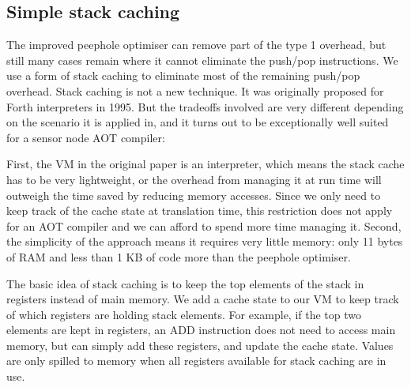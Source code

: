 
\subsection{Simple stack caching}
\label{sec-optimisations-simple-stack-caching}


The improved peephole optimiser can remove part of the type 1 overhead, but still many cases remain where it cannot eliminate the push/pop instructions. We use a form of stack caching \cite{Ertl:1995dv} to eliminate most of the remaining push/pop overhead. Stack caching is not a new technique. It was originally proposed for Forth interpreters in 1995. But the tradeoffs involved are very different depending on the scenario it is applied in, and it turns out to be exceptionally well suited for a sensor node AOT compiler:

First, the VM in the original paper is an interpreter, which means the stack cache has to be very lightweight, or the overhead from managing it at run time will outweigh the time saved by reducing memory accesses. Since we only need to keep track of the cache state at translation time, this restriction does not apply for an AOT compiler and we can afford to spend more time managing it. Second, the simplicity of the approach means it requires very little memory: only 11 bytes of RAM and less than 1 KB of code more than the peephole optimiser.

The basic idea of stack caching is to keep the top elements of the stack in registers instead of main memory. We add a cache state to our VM to keep track of which registers are holding stack elements. For example, if the top two elements are kept in registers, an ADD instruction does not need to access main memory, but can simply add these registers, and update the cache state. Values are only spilled to memory when all registers available for stack caching are in use.

